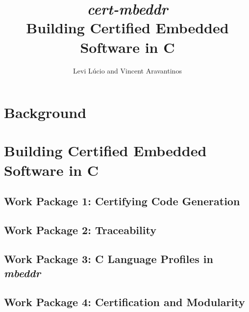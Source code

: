 \documentclass{llncs}
\begin{document}
%
\frontmatter          %
%
\pagestyle{headings}  %

\mainmatter              %
%
\title{\emph{cert-mbeddr}\\Building Certified Embedded Software in C}


\author{Levi L{\'u}cio and Vincent Aravantinos}


\maketitle              %
\setcounter{footnote}{0}

\section{Background} 
\label{sec:background} 



\section{Building Certified Embedded Software in C}
\label{sec:project_certification} 



\subsection{Work Package 1: Certifying Code Generation}
\label{sec:wp1}
 


\subsection{Work Package 2: Traceability}
\label{sec:wp2}
 


\subsection{Work Package 3: C Language Profiles in \emph{mbeddr}}
\label{sec:wp3}
 


\subsection{Work Package 4: Certification and Modularity}
\label{sec:wp4}
  
\end{document}
